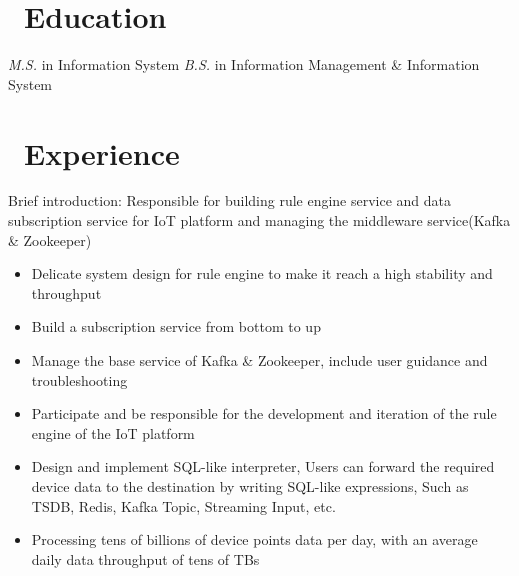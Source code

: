 \documentclass{resume}
\begin{document}



\section{\faGraduationCap\ Education}
\textit{M.S.} in Information System
\textit{B.S.} in Information Management & Information System

\section{\faUsers\ Experience }
\role{Senior Software Engineer}
    Brief introduction: Responsible for building rule engine service and data subscription service for IoT platform and managing the middleware service(Kafka \& Zookeeper)
\begin{itemize}
  \item Delicate system design for rule engine to make it reach a high stability and throughput
  \item Build a subscription service from bottom to up
  \item Manage the base service of Kafka & Zookeeper, include user guidance and troubleshooting
\end{itemize}

\begin{itemize}
  \item Participate and be responsible for the development and iteration of the rule engine of the IoT platform
  \item Design and implement SQL-like interpreter, Users can forward the required device data to the destination by writing SQL-like expressions, Such as TSDB, Redis, Kafka Topic, Streaming Input, etc.
  \item Processing tens of billions of device points data per day, with an average daily data throughput of tens of TBs
\end{itemize}
\end{document}
